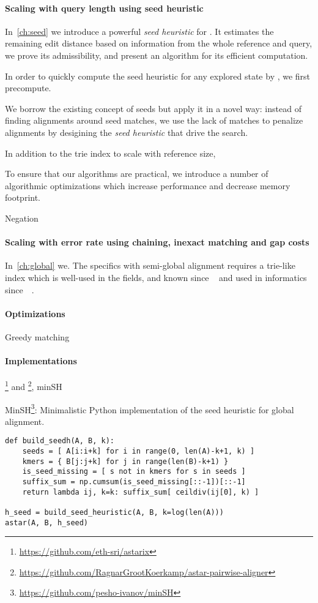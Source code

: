 \paragraph{Scaling with query length using seed heuristic}
In~\cref{ch:seed} we introduce a powerful \emph{seed heuristic} for \A. It
estimates the remaining edit distance based on information from the whole
reference and query, we prove its admissibility, and present an algorithm for
its efficient computation.

In order to quickly compute the seed heuristic for any explored state by \A, we
first precompute.

We borrow the existing concept of seeds but apply it in a novel way: instead of
finding alignments around seed matches, we use the lack of matches to penalize
alignments by desigining the \emph{seed heuristic} that drive the \A search.

In addition to the trie index to scale with reference size, 

To ensure that our algorithms are practical, we introduce a number of
algorithmic optimizations which increase performance and decrease memory
footprint.

Negation

\paragraph{Scaling with error rate using chaining, inexact matching and gap costs}
In~\cref{ch:global} we. The specifics with semi-global alignment requires a
trie-like index which is well-used in the fields, and known since
\citeyear{thue1912gegenseitige}~\cite{thue1912gegenseitige} and used in
informatics since~\citeyear{de1959file}~\cite{de1959file}.

\paragraph{Optimizations} Greedy matching

\paragraph{Implementations}
\astarix\footnote{\url{https://github.com/eth-sri/astarix}} and \astarpa\footnote{\url{https://github.com/RagnarGrootKoerkamp/astar-pairwise-aligner}}, minSH

MinSH\footnote{\url{https://github.com/pesho-ivanov/minSH}}: Minimalistic Python
implementation of the seed heuristic for global alignment.

\begin{verbatim}
def build_seedh(A, B, k):
    seeds = [ A[i:i+k] for i in range(0, len(A)-k+1, k) ]
    kmers = { B[j:j+k] for j in range(len(B)-k+1) }
    is_seed_missing = [ s not in kmers for s in seeds ]
    suffix_sum = np.cumsum(is_seed_missing[::-1])[::-1]
    return lambda ij, k=k: suffix_sum[ ceildiv(ij[0], k) ]

h_seed = build_seed_heuristic(A, B, k=log(len(A)))
astar(A, B, h_seed)
\end{verbatim}